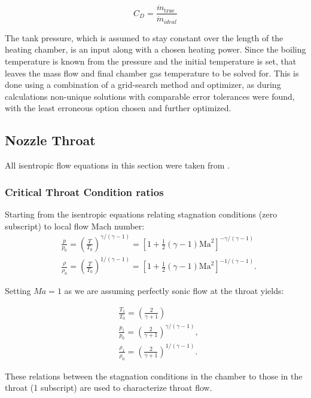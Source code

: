 \documentclass{homework}
\begin{document}
\begin{multicols}{2}
    $$
    C_D = \frac{\dot{m}_{\text {true }}}{\dot{m}_{ideal}}
    $$
	    
  The tank pressure, which is assumed to stay constant over the length of the heating chamber, is an input along with a chosen heating power. Since the boiling temperature is known from the pressure and the initial temperature is set, that leaves the mass flow and final chamber gas temperature to be solved for. This is done using a combination of a grid-search method and optimizer, as during calculations non-unique solutions with comparable error tolerances were found, with the least erroneous option chosen and further optimized.  
\subsection{Nozzle Throat}

All isentropic flow equations in this section were taken from \cite{machnumber}.

\subsubsection{Critical Throat Condition ratios}
      
		  Starting from the isentropic equations relating stagnation conditions (zero subscript) to local flow Mach number:  
	   $$  
        \begin{aligned}
            & \frac{p}{p_0}=\left(\frac{T}{T_0}\right)^{\gamma /(\gamma-1)}=\left[1+\frac{1}{2}(\gamma-1) \mathrm{Ma}^2\right]^{-\gamma /(\gamma-1)} \\
            & \frac{\rho}{\rho_0}=\left(\frac{T}{T_0}\right)^{1 /(\gamma-1)}=\left[1+\frac{1}{2}(\gamma-1) \mathrm{Ma}^2\right]^{-1 /(\gamma-1)} .
        \end{aligned}
        $$
		    
		  Setting $Ma = 1$ as we are assuming perfectly sonic flow at the throat yields:  
		    
        $$
        \begin{aligned}
            & \frac{T_1}{T_0}=\left(\frac{2}{\gamma+1}\right) \\
            & \frac{p_1}{p_0}=\left(\frac{2}{\gamma+1}\right)^{\gamma /(\gamma-1)}, \\
            & \frac{\rho_1}{\rho_0}=\left(\frac{2}{\gamma+1}\right)^{1 /(\gamma-1)} .
        \end{aligned}
        $$
		    
		  These relations between the stagnation conditions in the chamber to those in the throat (1 subscript) are used to characterize throat flow.  


\end{multicols}
\end{document}
